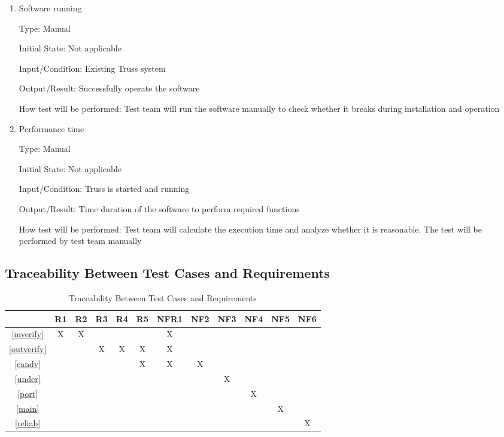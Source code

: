 \documentclass[12pt, titlepage]{article}
\begin{document}
\begin{enumerate}
	
	\item{Software running\\}
	
	Type: Manual
	
	Initial State: Not applicable
	
	Input/Condition: Existing Truss system
	
	Output/Result: Successfully operate the software
	
	How test will be performed: Test team will run the software manually to 
	check whether it breaks during installation and operation
	
	\item{Performance time\\}
	
	Type: Manual
	
	Initial State: Not applicable
	
	Input/Condition: Truss is started and running
	
	Output/Result: Time duration of the software to perform required functions
	
	How test will be performed: Test team will calculate the execution time and 
	analyze whether it is reasonable. The test will be performed by test team 
	manually
	
\end{enumerate}

\subsection{Traceability Between Test Cases and Requirements}

\begin{table}[h!]
	\centering
	\begin{tabular}{|c|c|c|c|c|c|c|c|c|c|c|c|}
		\hline
		& R1 & R2 & R3 & R4 & R5 & NFR1 & NF2 & NF3 & NF4 & NF5 &NF6\\
		\hline
		\ref{inverify}    &X &X & & & &X & & & & &\\ \hline
		\ref{outverify}   & & &X &X &X &X & & & & &\\ \hline
		\ref{candv}       & & & & &X &X &X & & & &\\ \hline
		\ref{under}       & & & & & & & &X & & &\\ \hline
		\ref{port}        & & & & & & & & &X & &\\ \hline
		\ref{main}        & & & & & & & & & &X &\\ \hline
		\ref{reliab}      & & & & & & & & & & &X\\ \hline
	\end{tabular}
	\caption{Traceability Between Test Cases and Requirements}
	\label{Table:A_trace}
\end{table}
\end{document}
